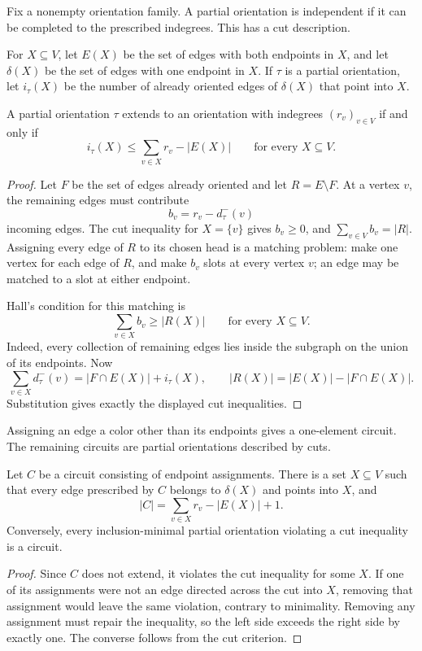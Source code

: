 Fix a nonempty orientation family. A partial orientation is independent if
it can be completed to the prescribed indegrees. This has a cut description.

For $X\subseteq V$, let $E(X)$ be the set of edges with both endpoints in
$X$, and let $\delta(X)$ be the set of edges with one endpoint in $X$. If
$\tau$ is a partial orientation, let $i_\tau(X)$ be the number of already
oriented edges of $\delta(X)$ that point into $X$.

\begin{proposition}
A partial orientation $\tau$ extends to an orientation with indegrees
$(r_v)_{v\in V}$ if and only if
\[
 i_\tau(X)
 \leq
 \sum_{v\in X}r_v-|E(X)|
 \qquad\text{for every }X\subseteq V.
\]
\end{proposition}

\begin{proof}
Let $F$ be the set of edges already oriented and let $R=E\setminus F$. At a
vertex $v$, the remaining edges must contribute
\[
 b_v=r_v-d^-_\tau(v)
\]
incoming edges. The cut inequality for $X=\{v\}$ gives $b_v\geq0$, and
$\sum_{v\in V}b_v=|R|$. Assigning every edge of $R$ to its chosen head is a matching
problem: make one vertex for each edge of $R$, and make $b_v$ slots at every
vertex $v$; an edge may be matched to a slot at either endpoint.

Hall's condition for this matching is
\[
 \sum_{v\in X}b_v\geq |R(X)|
 \qquad\text{for every }X\subseteq V.
\]
Indeed, every collection of remaining edges lies inside the subgraph on the
union of its endpoints. Now
\[
 \sum_{v\in X}d^-_\tau(v)
 =|F\cap E(X)|+i_\tau(X),
 \qquad
 |R(X)|=|E(X)|-|F\cap E(X)|.
\]
Substitution gives exactly the displayed cut inequalities.
\end{proof}

Assigning an edge a color other than its endpoints gives a one-element
circuit. The remaining circuits are partial orientations described by cuts.

\begin{corollary}
Let $C$ be a circuit consisting of endpoint assignments. There is a set
$X\subseteq V$ such that every edge prescribed by $C$ belongs to $\delta(X)$
and points into $X$, and
\[
 |C|=\sum_{v\in X}r_v-|E(X)|+1.
\]
Conversely, every inclusion-minimal partial orientation violating a cut
inequality is a circuit.
\end{corollary}

\begin{proof}
Since $C$ does not extend, it violates the cut inequality for some $X$. If
one of its assignments were not an edge directed across the cut into $X$,
removing that assignment would leave the same violation, contrary to
minimality. Removing any assignment must repair the inequality, so the left
side exceeds the right side by exactly one. The converse follows from the
cut criterion.
\end{proof}

